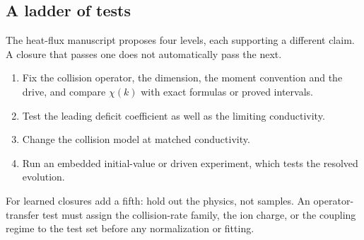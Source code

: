 \subsection{A ladder of tests}

The heat-flux manuscript proposes four levels, each supporting a different
claim. A closure that passes one does not automatically pass the next.
\begin{enumerate}
  \item Fix the collision operator, the dimension, the moment convention and
    the drive, and compare $\chi(k)$ with exact formulas or proved
    intervals.
  \item Test the leading deficit coefficient as well as the limiting
    conductivity.
  \item Change the collision model at matched conductivity.
  \item Run an embedded initial-value or driven experiment, which tests the
    resolved evolution.
\end{enumerate}
For learned closures add a fifth: hold out the physics, not samples. An
operator-transfer test must assign the collision-rate family, the ion
charge, or the coupling regime to the test set before any normalization or
fitting.
